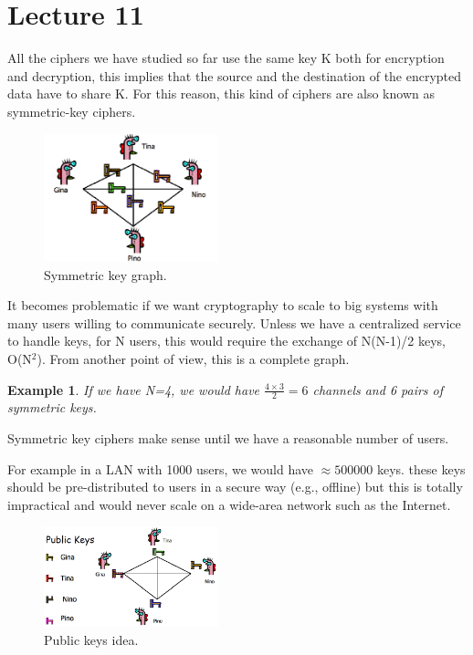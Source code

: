 \documentclass[a4paper, 12pt]{report}
\newtheorem{example}{\textbf{Example}}
\begin{document}
\chapter*{Lecture 11}
All the ciphers we have studied so far use the same key K both for encryption and decryption, this implies that the source and the destination of the encrypted data have to share K. For this reason, this kind of ciphers are also known as symmetric-key ciphers.

\begin{figure}
	\includegraphics[width=0.45\textwidth]{images/Lec11/simmkeys.png}
	\caption{Symmetric key graph.}
	\label{fig:simmkeys}
\end{figure}

It becomes problematic if we want cryptography to scale to big systems with many users willing to communicate securely. Unless we have a centralized service to handle keys, for N users, this would require the exchange of N(N-1)/2 keys, O(N$^2$). From another point of view, this is a complete graph.
\begin{example}
	If we have N=4, we would have $\frac{4\times 3}{2}=6$ channels and 6 pairs of symmetric keys.
\end{example}

Symmetric key ciphers make sense until we have a reasonable number of users.

For example in a LAN with 1000 users, we would have $\approx500000$ keys. these keys should be pre-distributed to users in a secure way (e.g., offline) but this is totally impractical and would never scale on a wide-area network such as the Internet.

\begin{figure}
	\includegraphics[width=0.45\textwidth]{images/Lec11/publickeys.png}
	\caption{Public keys idea.}
	\label{fig:publickeys}
\end{figure}
\end{document}
